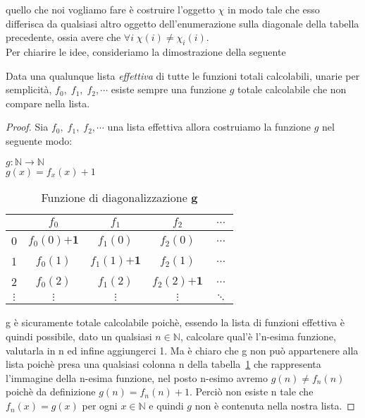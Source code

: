 quello che noi vogliamo fare \`e costruire l'oggetto $\chi$ in modo tale che
esso differisca da qualsiasi altro oggetto dell'enumerazione sulla diagonale
della tabella precedente, ossia avere che $\forall i \; \chi(i) \neq
\chi_{i}(i)$.\\
Per chiarire le idee, consideriamo la dimostrazione della seguente

\begin{proposizione}\label{TotCalcNonNum} Data una qualunque lista
\emph{effettiva} di tutte le funzioni totali calcolabili, unarie per
semplicit\`a, $f_{0},\; f_{1},\; f_{2}, \cdots$ esiste sempre una funzione $g$
totale calcolabile che non compare nella lista.
\end{proposizione}
\begin{proof} Sia $f_{0},\; f_{1},\; f_{2}, \cdots$ una lista effettiva allora
costruiamo la funzione $g$ nel seguente modo:\\
\begin{center}
$g: \mathbb{N} \to \mathbb{N}$\\
$g(x) = f_{x}(x) + 1$
\end{center}
\begin{table}[!h]
\begin{center}
\begin{tabular}{|c|c|c|c|c}

\hline
 & $f_0$ & $f_1$ & $f_2$ & $\ldots$\\
\hline
0 & $f_0(0) \mathbf{+1}$ & $f_1(0)$  & $f_2(0)$  & $\ldots$\\
\hline
1 & $f_0(1)$ & $f_1(1) \mathbf{+1}$  & $f_2(1)$  & $\ldots$\\
\hline
2 &  $f_0(2)$ & $f_1(2)$  & $f_2(2) \mathbf{+1}$  & $\ldots$\\
\hline
$\vdots$ & $\vdots$ &       $\vdots$  & $\vdots$  & $\ddots$\\


\end{tabular}
\end{center}
\caption{Funzione di diagonalizzazione $\mathbf{g}$}
\label{diagG}
\end{table}
g \`e sicuramente totale calcolabile poich\`e, essendo la lista di funzioni
effettiva \`e quindi possibile, dato un qualsiasi $n \in \mathbb{N}$, calcolare
qual'\`e l'\textrm{n-esima} funzione, valutarla in n ed infine aggiungerci 1. Ma
\`e chiaro che g non pu\`o appartenere alla lista poich\`e presa una qualsiasi
colonna n della tabella~\ref{diagG} che rappresenta l'immagine della
\textrm{n-esima} funzione, nel posto \textrm{n-esimo} avremo $g(n) \neq
f_{n}(n)$ poich\`e da definizione $g(n)=f_{n}(n)+1$. Perci\`o non esiste n tale
che $f_{n}(x)=g(x)$ per ogni $x \in \mathbb{N}$ e quindi $g$ non \`e contenuta
nella nostra lista.
\end{proof}


